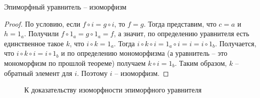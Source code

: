 \begin{thm}
  Эпиморфный уравнитель -- изоморфизм
\end{thm}
\begin{proof}
  По условию, если $f \circ i = g \circ i$, то $f = g$.
  Тогда представим, что $c = a$ и $h = 1_a$.
  Получили $f \circ 1_a = g \circ 1_a = f$, а значит,
  по определению уравнителя есть единственное такое $k$, что $i \circ k = 1_a$.
  Тогда $i \circ k \circ i = 1_a \circ i = i = i \circ 1_b$.
  Получается, что $i \circ k \circ i = i \circ 1_b$ и по определению мономорфизма
  (а уравнитель -- это мономорфизм по прошлой теореме) получаем $k \circ i = 1_b$.
  Таким образом, $k$ -- обратный элемент для $i$.
  Поэтому $i$ -- изоморфизм.
\end{proof}
\begin{figure}[h]
  \centering
  \caption{К доказательству изоморфности эпиморфного уравнителя}
  \label{fig:equaliser-isomorphism}
\end{figure}

